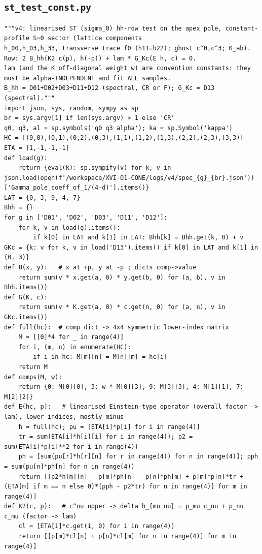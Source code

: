 \documentclass[10pt]{article}
\begin{document}
\subsection{\texttt{st\_test\_const.py}}
\begin{lstlisting}
"""v4: linearised ST (sigma_0) hh-row test on the apex pole, constant-profile S=0 sector (lattice components
h_00,h_03,h_33, transverse trace f0 (h11=h22); ghost c^0,c^3; K_ab).  Row: 2 B_hh(K2 c(p), h(-p)) + lam * G_Kc(E h, c) = 0.
lam (and the K off-diagonal weight w) are convention constants: they must be alpha-INDEPENDENT and fit ALL samples.
B_hh = D01+D02+D03+D11+D12 (spectral, CR or F); G_Kc = D13 (spectral)."""
import json, sys, random, sympy as sp
br = sys.argv[1] if len(sys.argv) > 1 else 'CR'
q0, q3, al = sp.symbols('q0 q3 alpha'); ka = sp.Symbol('kappa')
HC = [(0,0),(0,1),(0,2),(0,3),(1,1),(1,2),(1,3),(2,2),(2,3),(3,3)]
ETA = [1,-1,-1,-1]
def load(g):
    return {eval(k): sp.sympify(v) for k, v in json.load(open(f'/workspace/XVI-O1-CONE/logs/v4/spec_{g}_{br}.json'))['Gamma_pole_coeff_of_1/(4-d)'].items()}
LAT = {0, 3, 9, 4, 7}
Bhh = {}
for g in ['D01', 'D02', 'D03', 'D11', 'D12']:
    for k, v in load(g).items():
        if k[0] in LAT and k[1] in LAT: Bhh[k] = Bhh.get(k, 0) + v
GKc = {k: v for k, v in load('D13').items() if k[0] in LAT and k[1] in (0, 3)}
def B(x, y):   # x at +p, y at -p ; dicts comp->value
    return sum(v * x.get(a, 0) * y.get(b, 0) for (a, b), v in Bhh.items())
def G(K, c):
    return sum(v * K.get(a, 0) * c.get(n, 0) for (a, n), v in GKc.items())
def full(hc):  # comp dict -> 4x4 symmetric lower-index matrix
    M = [[0]*4 for _ in range(4)]
    for i, (m, n) in enumerate(HC):
        if i in hc: M[m][n] = M[n][m] = hc[i]
    return M
def comps(M, w):
    return {0: M[0][0], 3: w * M[0][3], 9: M[3][3], 4: M[1][1], 7: M[2][2]}
def E(hc, p):   # linearised Einstein-type operator (overall factor -> lam), lower indices, mostly minus
    h = full(hc); pu = [ETA[i]*p[i] for i in range(4)]
    tr = sum(ETA[i]*h[i][i] for i in range(4)); p2 = sum(ETA[i]*p[i]**2 for i in range(4))
    ph = [sum(pu[r]*h[r][n] for r in range(4)) for n in range(4)]; pph = sum(pu[n]*ph[n] for n in range(4))
    return [[p2*h[m][n] - p[m]*ph[n] - p[n]*ph[m] + p[m]*p[n]*tr + (ETA[m] if m == n else 0)*(pph - p2*tr) for n in range(4)] for m in range(4)]
def K2(c, p):   # c^nu upper -> delta h_{mu nu} = p_mu c_nu + p_nu c_mu (factor -> lam)
    cl = [ETA[i]*c.get(i, 0) for i in range(4)]
    return [[p[m]*cl[n] + p[n]*cl[m] for n in range(4)] for m in range(4)]

\end{lstlisting}
\end{document}
